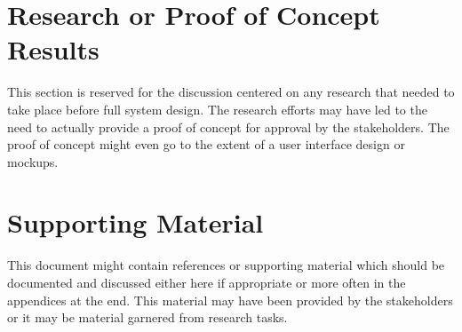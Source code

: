 \section{Research or Proof of Concept Results}
This section is reserved for the discussion centered on any research that needed 
to take place before full system design.  The research efforts may have led to 
the need to actually provide a proof of concept for approval by the stakeholders. 
 The proof of concept might even go to the extent of a user interface design or 
mockups. 


\section{Supporting Material}


This document might contain references or supporting material which should be documented 
and discussed  either here if appropriate or more often in the appendices at the end.  This material may have been provided by the stakeholders  
or it may be material garnered from research tasks.

